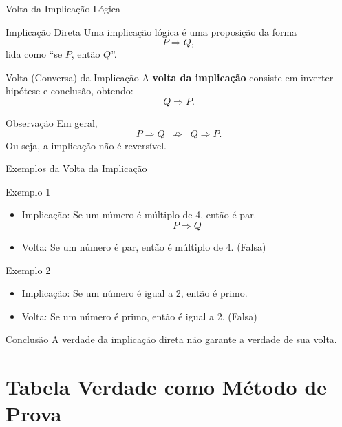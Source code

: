 \documentclass[9pt]{beamer}
\begin{document}
\begin{frame}{Volta da Implicação Lógica}
\small

\begin{block}{Implicação Direta}
Uma implicação lógica é uma proposição da forma
\[
P \Rightarrow Q,
\]
lida como “se $P$, então $Q$”.
\end{block}

\begin{block}{Volta (Conversa) da Implicação}
A \textbf{volta da implicação} consiste em inverter
hipótese e conclusão, obtendo:
\[
Q \Rightarrow P.
\]
\end{block}

\begin{block}{Observação}
Em geral,
\[
P \Rightarrow Q \;\;\not\Rightarrow\;\; Q \Rightarrow P.
\]
Ou seja, a implicação não é reversível.
\end{block}

\end{frame}
\begin{frame}{Exemplos da Volta da Implicação}
\small

\begin{block}{Exemplo 1}
\begin{itemize}
    \item Implicação:  
    Se um número é múltiplo de 4, então é par.
    \[
    P \Rightarrow Q
    \]
    \item Volta:  
    Se um número é par, então é múltiplo de 4. \quad (Falsa)
\end{itemize}
\end{block}

\begin{block}{Exemplo 2}
\begin{itemize}
    \item Implicação:  
    Se um número é igual a 2, então é primo.
    \item Volta:  
    Se um número é primo, então é igual a 2. \quad (Falsa)
\end{itemize}
\end{block}

\begin{block}{Conclusão}
A verdade da implicação direta
não garante a verdade de sua volta.
\end{block}

\end{frame}
\section{Tabela Verdade como Método de Prova}
\end{document}
